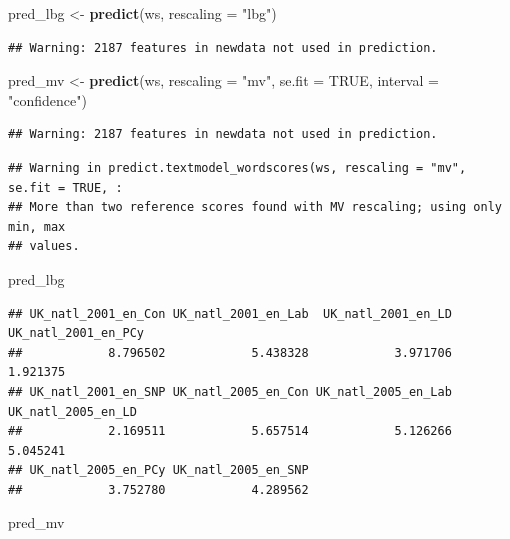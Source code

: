 \documentclass[
]{book}
\newenvironment{Shaded}{\begin{snugshade}}{\end{snugshade}}
\newcommand{\AttributeTok}[1]{\textcolor[rgb]{0.13,0.29,0.53}{#1}}
\newcommand{\ConstantTok}[1]{\textcolor[rgb]{0.56,0.35,0.01}{#1}}
\newcommand{\FunctionTok}[1]{\textcolor[rgb]{0.13,0.29,0.53}{\textbf{#1}}}
\newcommand{\NormalTok}[1]{#1}
\newcommand{\OtherTok}[1]{\textcolor[rgb]{0.56,0.35,0.01}{#1}}
\newcommand{\StringTok}[1]{\textcolor[rgb]{0.31,0.60,0.02}{#1}}
\begin{document}
\begin{Shaded}
\begin{Highlighting}[]
\NormalTok{pred\_lbg }\OtherTok{\textless{}{-}} \FunctionTok{predict}\NormalTok{(ws, }\AttributeTok{rescaling =} \StringTok{"lbg"}\NormalTok{)}
\end{Highlighting}
\end{Shaded}

\begin{verbatim}
## Warning: 2187 features in newdata not used in prediction.
\end{verbatim}

\begin{Shaded}
\begin{Highlighting}[]
\NormalTok{pred\_mv }\OtherTok{\textless{}{-}} \FunctionTok{predict}\NormalTok{(ws, }\AttributeTok{rescaling =} \StringTok{"mv"}\NormalTok{, }\AttributeTok{se.fit =} \ConstantTok{TRUE}\NormalTok{, }\AttributeTok{interval =} \StringTok{"confidence"}\NormalTok{)}
\end{Highlighting}
\end{Shaded}

\begin{verbatim}
## Warning: 2187 features in newdata not used in prediction.
\end{verbatim}

\begin{verbatim}
## Warning in predict.textmodel_wordscores(ws, rescaling = "mv", se.fit = TRUE, :
## More than two reference scores found with MV rescaling; using only min, max
## values.
\end{verbatim}

\begin{Shaded}
\begin{Highlighting}[]
\NormalTok{pred\_lbg}
\end{Highlighting}
\end{Shaded}

\begin{verbatim}
## UK_natl_2001_en_Con UK_natl_2001_en_Lab  UK_natl_2001_en_LD UK_natl_2001_en_PCy 
##            8.796502            5.438328            3.971706            1.921375 
## UK_natl_2001_en_SNP UK_natl_2005_en_Con UK_natl_2005_en_Lab  UK_natl_2005_en_LD 
##            2.169511            5.657514            5.126266            5.045241 
## UK_natl_2005_en_PCy UK_natl_2005_en_SNP 
##            3.752780            4.289562
\end{verbatim}

\begin{Shaded}
\begin{Highlighting}[]
\NormalTok{pred\_mv}
\end{Highlighting}
\end{Shaded}
\end{document}
